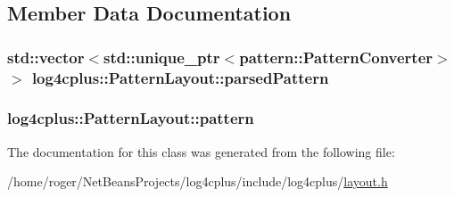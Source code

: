 \subsection{Member Data Documentation}
\hypertarget{classlog4cplus_1_1PatternLayout_a676c577a96c27492952b9e4dc44097b7}{
\subsubsection[{parsed\-Pattern}]{\setlength{\rightskip}{0pt plus 5cm}std\-::vector$<$std\-::unique\-\_\-ptr$<$pattern\-::\-Pattern\-Converter$>$ $>$ log4cplus\-::\-Pattern\-Layout\-::parsed\-Pattern\hspace{0.3cm}{\ttfamily [protected]}}}\label{classlog4cplus_1_1PatternLayout_a676c577a96c27492952b9e4dc44097b7}
\hypertarget{classlog4cplus_1_1PatternLayout_a8aa018a29471f32647095e76c6345321}{
\subsubsection[{pattern}]{ log4cplus\-::\-Pattern\-Layout\-::pattern\hspace{0.3cm}{\ttfamily [protected]}}}\label{classlog4cplus_1_1PatternLayout_a8aa018a29471f32647095e76c6345321}


The documentation for this class was generated from the following file\-:\begin{DoxyCompactItemize}
\item 
/home/roger/\-Net\-Beans\-Projects/log4cplus/include/log4cplus/\hyperlink{layout_8h}{layout.\-h}\end{DoxyCompactItemize}
